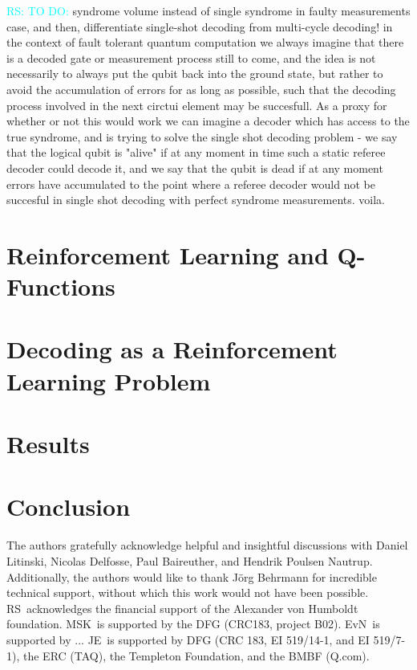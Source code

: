 \documentclass[onecolumn,preprintnumbers,amsmath,amssymb,notitlepage,nofootinbib,longbibliography,superscriptaddress,aps,pra,10pt]{revtex4-1}
\newcommand{\ryan}[1]{\textcolor{Cyan}{RS: #1}}
\begin{document}
    \ryan{TO DO:} syndrome volume instead of single syndrome in faulty measurements case, and then, differentiate single-shot decoding from multi-cycle decoding! in the context of fault tolerant quantum computation we always imagine that there is a decoded gate or measurement process still to come, and the idea is not necessarily to always put the qubit back into the ground state, but rather to avoid the accumulation of errors for as long as possible, such that the decoding process involved in the next circtui element may be succesfull. As a proxy for whether or not this would work we can imagine a decoder which has access to the true syndrome, and is trying to solve the single shot decoding problem - we say that the logical qubit is "alive" if at any moment in time such a static referee decoder could decode it, and we say that the qubit is dead if at any moment errors have accumulated to the point where a referee decoder would not be succesful in single shot decoding with perfect syndrome measurements. voila.

   






\section{Reinforcement Learning and Q-Functions}\label{s:reinforcement_learning}
\section{Decoding as a Reinforcement Learning Problem}\label{s:decoding_as_rl}
\section{Results}\label{s:results}
\section{Conclusion}\label{s:conclusions}


\begin{acknowledgments}
	The authors gratefully acknowledge helpful and insightful discussions with Daniel Litinski, Nicolas Delfosse, Paul Baireuther, and Hendrik Poulsen Nautrup.
	Additionally, the authors would like to thank J\"{o}rg Behrmann for incredible technical support, without which this work would not have been possible.
	RS\ acknowledges the financial support of the Alexander von Humboldt foundation.
	MSK\ is supported by the DFG (CRC183, project B02).
	EvN\ is supported by ...
	JE\ is supported by DFG (CRC 183, EI 519/14-1, and EI 519/7-1), the ERC (TAQ), the Templeton Foundation, and the BMBF (Q.com).
\end{acknowledgments}


\end{document}
